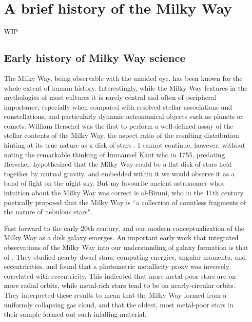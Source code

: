 
\section{A brief history of the Milky Way}

WIP


\subsection{Early history of Milky Way science}

The Milky Way, being observable with the unaided eye, has been known for the whole extent of human history. Interestingly, while the Milky Way features in the mythologies of most cultures it is rarely central and often of peripheral importance, especially when compared with resolved stellar associations and constellations, and particularly dynamic astronomical objects such as planets or comets. William Herschel was the first to perform a well-defined assay of the stellar contents of the Milky Way, the aspect ratio of the resulting distribution hinting at its true nature as a disk of stars \parencite{herschel1785}. I cannot continue, however, without noting the remarkable thinking of Immanuel Kant who in 1755, predating Herschel, hypothesized that the Milky Way could be a flat disk of stars held together by mutual gravity, and embedded within it we would observe it as a band of light on the night sky. But my favourite ancient astronomer whos intuition about the Milky Way was correct is al-Biruni, who in the 11th century poetically proposed that the Milky Way is ``a collection of countless fragments of the nature of nebulous stars".

Fast forward to the early 20th century, and our modern conceptualization of the Milky Way as a disk galaxy emerges. An important early work that integrated observations of the Milky Way into our understanding of galaxy formation is that of \textcite{eggen62}. They studied nearby dwarf stars, computing energies, angular momenta, and eccentricities, and found that a photometric metallicity proxy was inversely correlated with eccentricity. This indicated that more metal-poor stars are on more radial orbits, while metal-rich stars tend to be on nearly-circular orbits. They interpreted these results to mean that the Milky Way formed from a uniformly collapsing gas cloud, and that the oldest, most metal-poor stars in their sample formed out such infalling material.

